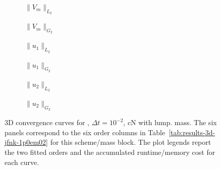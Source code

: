 \begin{figure}[p]
\centering
\begin{subfigure}{0.485\linewidth}
\centering
{}
\caption{$\|V_m\|_{L_2}$}
\label{fig:results-3d-jfnk-1p0em02-cranknicolson-lumped-a}
\end{subfigure}
\hfill
\begin{subfigure}{0.485\linewidth}
\centering
{}
\caption{$\|V_m\|_{G_2}$}
\label{fig:results-3d-jfnk-1p0em02-cranknicolson-lumped-b}
\end{subfigure}
\par\vspace{0.8em}
\begin{subfigure}{0.485\linewidth}
\centering
{}
\caption{$\|u_1\|_{L_2}$}
\label{fig:results-3d-jfnk-1p0em02-cranknicolson-lumped-c}
\end{subfigure}
\hfill
\begin{subfigure}{0.485\linewidth}
\centering
{}
\caption{$\|u_1\|_{G_2}$}
\label{fig:results-3d-jfnk-1p0em02-cranknicolson-lumped-d}
\end{subfigure}
\par\vspace{0.8em}
\begin{subfigure}{0.485\linewidth}
\centering
{}
\caption{$\|u_2\|_{L_2}$}
\label{fig:results-3d-jfnk-1p0em02-cranknicolson-lumped-e}
\end{subfigure}
\hfill
\begin{subfigure}{0.485\linewidth}
\centering
{}
\caption{$\|u_2\|_{G_2}$}
\label{fig:results-3d-jfnk-1p0em02-cranknicolson-lumped-f}
\end{subfigure}
\caption{3D convergence curves for , $\Delta t=10^{-2}$, cN with lump. mass. The six panels correspond to the six order columns in Table~\ref{tab:results-3d-jfnk-1p0em02} for this scheme/mass block. The plot legends report the two fitted orders and the accumulated runtime/memory cost for each curve.}
\label{fig:results-3d-jfnk-1p0em02-cranknicolson-lumped}
\end{figure}
\FloatBarrier

